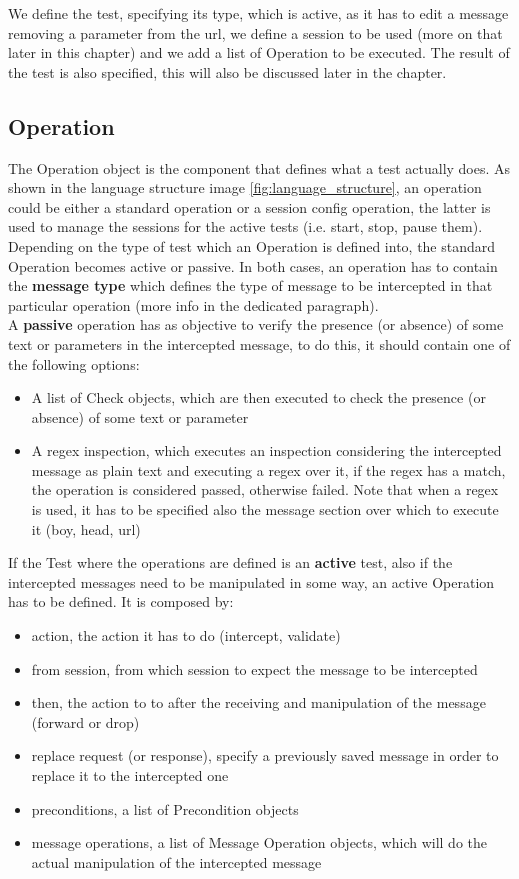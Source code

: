 We define the test, specifying its type, which is active, as it has to edit a message removing a parameter from the url, we define a session to be used (more on that later in this chapter) and we add a list of Operation to be executed. The result of the test is also specified, this will also be discussed later in the chapter.

\subsection{Operation}
The Operation object is the component that defines what a test actually does. As shown in the language structure image \ref{fig:language_structure}, an operation could be either a standard operation or a session config operation, the latter is used to manage the sessions for the active tests (i.e. start, stop, pause them). Depending on the type of test which an Operation is defined into, the standard Operation becomes active or passive.
In both cases, an operation has to contain the \textbf{message type} which defines the type of message to be intercepted in that particular operation (more info in the dedicated paragraph).
\\A \textbf{passive} operation has as objective to verify the presence (or absence) of some text or parameters in the intercepted message, to do this, it should contain one of the following options:
\begin{itemize}
    \item A list of Check objects, which are then executed to check the presence (or absence) of some text or parameter
    \item A regex inspection, which executes an inspection considering the intercepted message as plain text and executing a regex over it, if the regex has a match, the operation is considered passed, otherwise failed. Note that when a regex is used, it has to be specified also the message section over which to execute it (boy, head, url)
\end{itemize}

If the Test where the operations are defined is an \textbf{active} test, also if the intercepted messages need to be manipulated in some way, an active Operation has to be defined. It is composed by:
\begin{itemize}
    \item action, the action it has to do (intercept, validate)
    \item from session, from which session to expect the message to be intercepted
    \item then, the action to to after the receiving and manipulation of the message (forward or drop)
    \item replace request (or response), specify a previously saved message in order to replace it to the intercepted one
    \item preconditions, a list of Precondition objects
    \item message operations, a list of Message Operation objects, which will do the actual manipulation of the intercepted message
\end{itemize}

